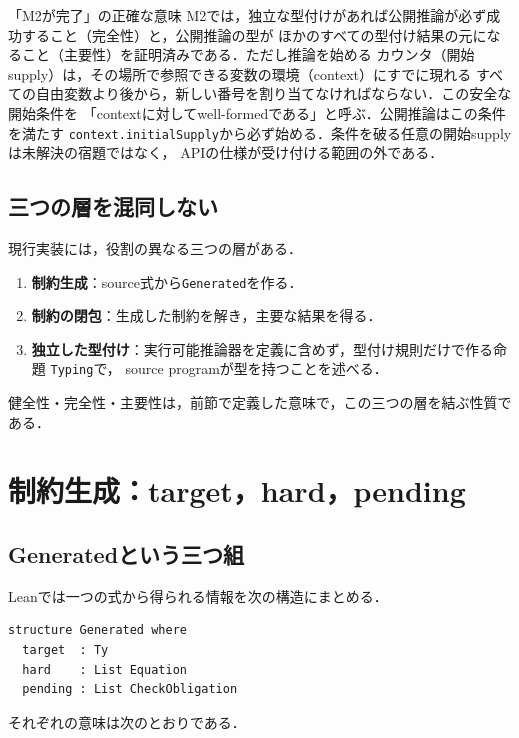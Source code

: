 \documentclass[11pt,a4paper,oneside]{ltjsbook}
\newcommand{\code}[1]{\texttt{#1}}
\begin{document}
\begin{pointbox}{「M2が完了」の正確な意味}
M2では，独立な型付けがあれば公開推論が必ず成功すること（完全性）と，公開推論の型が
ほかのすべての型付け結果の元になること（主要性）を証明済みである．ただし推論を始める
カウンタ（開始supply）は，その場所で参照できる変数の環境（context）にすでに現れる
すべての自由変数より後から，新しい番号を割り当てなければならない．この安全な開始条件を
「contextに対してwell-formedである」と呼ぶ．公開推論はこの条件を満たす
\code{context.initialSupply}から必ず始める．条件を破る任意の開始supplyは未解決の宿題ではなく，
APIの仕様が受け付ける範囲の外である．
\end{pointbox}

\section{三つの層を混同しない}

現行実装には，役割の異なる三つの層がある．

\begin{enumerate}[leftmargin=2em]
  \item \textbf{制約生成}：source式から\code{Generated}を作る．
  \item \textbf{制約の閉包}：生成した制約を解き，主要な結果を得る．
  \item \textbf{独立した型付け}：実行可能推論器を定義に含めず，型付け規則だけで作る命題
        \code{Typing}で，
        source programが型を持つことを述べる．
\end{enumerate}

健全性・完全性・主要性は，前節で定義した意味で，この三つの層を結ぶ性質である．

\chapter{制約生成：target，hard，pending}

\section{Generatedという三つ組}

Leanでは一つの式から得られる情報を次の構造にまとめる．

\begin{lstlisting}
structure Generated where
  target  : Ty
  hard    : List Equation
  pending : List CheckObligation
\end{lstlisting}

それぞれの意味は次のとおりである．
\end{document}
